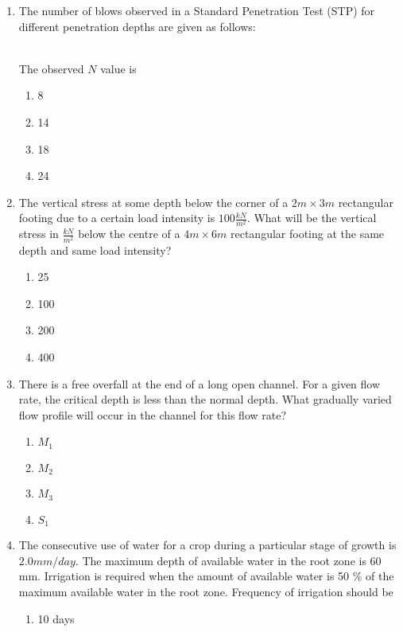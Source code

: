 \documentclass[journal]{IEEEtran}
\begin{document}
\begin{enumerate}
\begin{enumerate}
		\end{enumerate}
	\item
	The number of blows observed in a Standard Penetration Test (STP) for different penetration depths are given as follows: \\
	\begin{table}[h!]    	
    		\centering
    		 
       \end{table}
	\\
	The observed $N$ value is
		\begin{enumerate}
			\item 8
			\item 14
			\item 18
			\item 24
		\end{enumerate}
	\item
	The vertical stress at some depth below the corner of a $2m \times 3m$ rectangular footing due to a certain load intensity is $100 \frac{kN}{m^2}$. What will be the vertical stress in $\frac{kN}{m^2}$ below the centre of a $4m \times 6m$ rectangular footing at the same depth and same load intensity?
		\begin{enumerate}
			\item 25
			\item 100
			\item 200
			\item 400
		\end{enumerate}
	\item
	There is a free overfall at the end of a long open channel. For a given flow rate, the critical depth is less than the normal depth. What gradually varied flow profile will occur in the channel for this flow rate?
		\begin{enumerate}
			\item $M_1$
			\item $M_2$
			\item $M_3$
			\item $S_1$
		\end{enumerate}
	\item
	The consecutive use of water for a crop during a particular stage of growth is $2.0 mm/day$. The maximum depth of available water in the root zone is 60 mm. Irrigation is required when the amount of available water is 50 \% of the maximum available water in the root zone. Frequency of irrigation should be
		\begin{enumerate}
			\item 10 days

\end{enumerate}
\end{enumerate}
\end{document}
